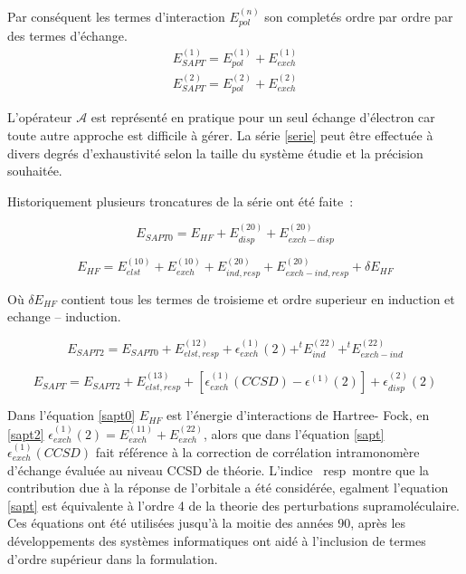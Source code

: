 Par conséquent les termes d'interaction $E_{pol}^{(n)}$ son completés ordre par ordre par des termes d'échange. 
\begin{equation}
\begin{split}
E_{SAPT}^{(1)} = E_{pol}^{(1)} + E_{exch}^{(1)}\\
E_{SAPT}^{(2)} = E_{pol}^{(2)} + E_{exch}^{(2)}
\end{split}
\end{equation}

L'opérateur $\mathscr{A}$ est représenté en pratique pour un seul échange d'électron car toute autre approche est difficile à gérer. La série \ref{serie} peut être effectuée à divers degrés d’exhaustivité selon la taille du système étudie et la précision souhaitée.  

Historiquement plusieurs troncatures de la série ont été faite :

\begin{equation}
E_{SAPT0} = E_{HF} + E_{disp}^{(20)} + E_{exch-disp}^{(20)} \label{sapt0}
\end{equation}

\begin{equation}
E_{HF} = E_{elst}^{(10)} + E_{exch}^{(10)} + E_{ind,resp}^{(20)} + E_{exch-ind,resp}^{(20)} + \delta E_{HF}
\end{equation}

Où $\delta E_{HF}$ contient tous les termes de troisieme et ordre superieur en induction et echange – induction. 

\begin{equation}
E_{SAPT2} = E_{SAPT0} + E_{elst,resp}^{(12)} + \epsilon_{exch}^{(1)} (2) + ^{t}E_{ind}^{(22)} + ^{t}E_{exch-ind}^{(22)} \label{sapt2}
\end{equation}

\begin{equation}
E_{SAPT} = E_{SAPT2} + E_{elst,resp}^{(13)} + [\epsilon_{exch}^{(1)} (CCSD) - \epsilon^{(1)}(2)] + \epsilon_{disp}^{(2)}(2) \label{sapt}
\end{equation}

Dans l’équation \ref{sapt0} $E_{HF}$ est l’énergie d’interactions de Hartree- Fock, en \ref{sapt2} $\epsilon_{exch}^{(1)}(2) = E_{exch}^{(11)} + E_{exch}^{(22)}$, alors que dans l’équation \ref{sapt}  $\epsilon_{exch}^{(1)}(CCSD)$ fait référence à la correction de corrélation intramonomère d’échange évaluée au niveau CCSD de théorie. L’indice \og resp \fg montre que la contribution due à la réponse de l’orbitale a été considérée, egalment l'equation \ref{sapt} est équivalente à l'ordre 4 de la theorie des perturbations supramoléculaire. Ces équations ont été utilisées jusqu'à la moitie des années 90, après les développements des systèmes informatiques ont aidé à l’inclusion de termes d’ordre supérieur dans la formulation.

